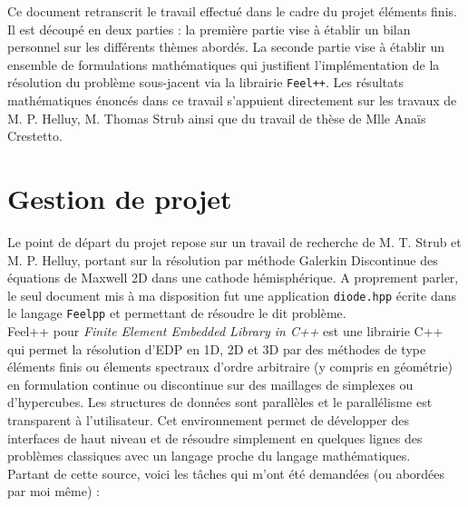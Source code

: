 \documentclass[a4paper,oneside,10pt]{report}
\begin{document}
\def\chaptername{Chapitre} 
 
\pagestyle{plain}


\tableofcontents


\newpage
\null
\vfill
Ce document retranscrit le travail effectué dans le cadre du projet éléments finis. Il est découpé en deux parties : la première partie vise à établir un bilan personnel sur les différents thèmes abordés. La seconde partie vise à établir un ensemble de formulations mathématiques qui justifient l'implémentation de la résolution du problème sous-jacent via la librairie \texttt{Feel++}. Les résultats mathématiques énoncés dans ce travail s'appuient directement sur les travaux de M. P. Helluy, M. Thomas Strub ainsi que du travail de thèse de Mlle Anaïs Crestetto. 
\vfill


\chapter{Gestion de projet}


Le point de départ du projet repose sur un travail de recherche de M. T. Strub et M. P. Helluy, portant sur la résolution par méthode Galerkin Discontinue des équations de Maxwell 2D dans une cathode hémisphérique. A proprement parler, le seul document mis à ma disposition fut une application \texttt{diode.hpp} écrite dans le langage \texttt{Feelpp} et permettant de résoudre le dit problème.\\

Feel++ pour {\it Finite Element Embedded Library in C++} est une librairie C++ qui permet la résolution d'EDP en 1D, 2D et 3D par des méthodes de type
éléments finis ou élements spectraux d'ordre arbitraire (y compris en géométrie) en formulation continue ou discontinue sur des maillages de simplexes ou
d'hypercubes. Les structures de données sont parallèles et le parallélisme est transparent à l'utilisateur.  Cet environnement permet de développer des interfaces de haut
niveau et de résoudre simplement en quelques lignes des problèmes classiques avec un langage proche du langage mathématiques.\\

 Partant de cette source, voici les tâches qui m'ont été demandées (ou abordées par moi même) :
\end{document}
